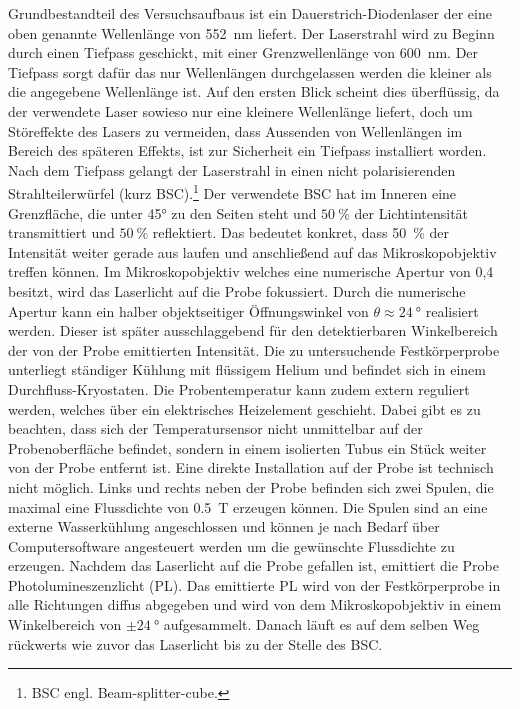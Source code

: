 Grundbestandteil des Versuchsaufbaus ist ein Dauerstrich-Diodenlaser der eine oben genannte Wellenlänge von 
\SI{552}{\nano\meter} liefert. 
Der Laserstrahl wird zu Beginn durch einen Tiefpass geschickt, mit einer Grenzwellenlänge von 
\SI{600}{\nano\meter}. Der Tiefpass sorgt dafür das nur Wellenlängen durchgelassen werden die 
kleiner als die angegebene Wellenlänge ist. Auf den ersten Blick scheint dies überflüssig, da der
verwendete Laser sowieso nur eine kleinere Wellenlänge liefert, doch um Störeffekte des Lasers zu vermeiden, 
dass Aussenden von Wellenlängen im Bereich des späteren Effekts, ist zur Sicherheit ein
Tiefpass installiert worden. 
Nach dem Tiefpass gelangt der Laserstrahl in einen 
nicht polarisierenden Strahlteilerwürfel (kurz BSC).\footnote{BSC engl. Beam-splitter-cube.}
Der verwendete BSC hat im Inneren eine Grenzfläche, die unter 45° zu den Seiten 
steht und $\SI{50}{\percent}$ der Lichtintensität transmittiert und $\SI{50}{\percent}$ reflektiert.
Das bedeutet konkret, dass 
\SI{50}{\percent} der Intensität weiter gerade aus laufen und anschließend auf das Mikroskopobjektiv 
treffen können. Im Mikroskopobjektiv welches eine numerische Apertur von 0,4 besitzt, wird 
das Laserlicht auf die Probe fokussiert. Durch die numerische Apertur kann ein
halber objektseitiger Öffnungswinkel von $\theta \approx \SI{24}{\degree}$ realisiert werden. 
Dieser ist später ausschlaggebend für den detektierbaren Winkelbereich der von der Probe emittierten
Intensität. 
Die zu untersuchende Festkörperprobe unterliegt ständiger Kühlung mit flüssigem Helium und befindet
sich in einem  Durchfluss-Kryostaten. Die Probentemperatur kann zudem extern reguliert werden, welches
über  ein elektrisches Heizelement geschieht.
Dabei gibt es zu beachten, dass sich der Temperatursensor nicht unmittelbar auf der 
Probenoberfläche befindet, sondern in einem isolierten Tubus ein Stück weiter von der Probe entfernt
ist. Eine direkte Installation auf der Probe ist technisch nicht möglich. 
Links und rechts neben der Probe befinden sich zwei Spulen, die maximal eine Flussdichte von
\SI{0.5}{\tesla} erzeugen können. 
Die Spulen sind an eine externe Wasserkühlung angeschlossen und können je nach Bedarf 
über Computersoftware angesteuert werden um die gewünschte Flussdichte zu erzeugen. 
Nachdem das Laserlicht auf die Probe gefallen ist, emittiert die Probe Photolumineszenzlicht (PL).
Das emittierte PL wird von der Festkörperprobe in alle Richtungen diffus abgegeben und 
wird von dem Mikroskopobjektiv in einem Winkelbereich von $\pm \SI{24}{\degree}$ aufgesammelt. 
Danach läuft es auf dem selben Weg rückwerts wie zuvor das Laserlicht bis zu der Stelle des BSC.
